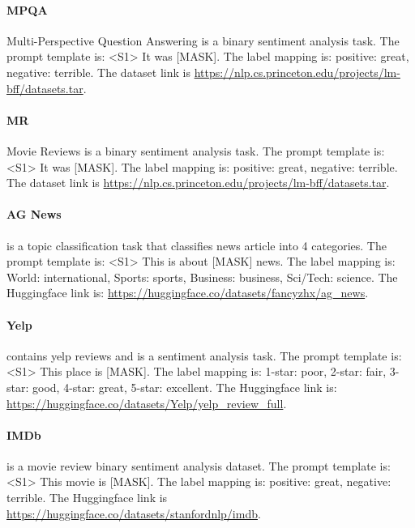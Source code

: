 \paragraph{MPQA} Multi-Perspective Question Answering \citep{wiebe2005annotating} is a binary sentiment analysis task. The prompt template is: \textless{}S1\textgreater{} It was {[}MASK{]}. The label mapping is: positive: great, negative: terrible. The dataset link is \url{https://nlp.cs.princeton.edu/projects/lm-bff/datasets.tar}.

\paragraph{MR} Movie Reviews \citep{pang2004sentimental} is a binary sentiment analysis task. The prompt template is: \textless{}S1\textgreater{} It was {[}MASK{]}. The label mapping is: positive: great, negative: terrible. The dataset link is \url{https://nlp.cs.princeton.edu/projects/lm-bff/datasets.tar}.

\paragraph{AG News} \citep{zhang2015character} is a topic classification task that classifies news article into 4 categories. The prompt template is: \textless{}S1\textgreater{} This is about {[}MASK{]} news. The label mapping is: World: international, Sports: sports, Business: business, Sci/Tech: science. The Huggingface link is: \url{https://huggingface.co/datasets/fancyzhx/ag_news}.

\paragraph{Yelp} \citep{zhang2015character} contains yelp reviews and is a sentiment analysis task. The prompt template is: \textless{}S1\textgreater{} This place is {[}MASK{]}. The label mapping is: 1-star: poor, 2-star: fair, 3-star: good, 4-star: great, 5-star: excellent. The Huggingface link is: \url{https://huggingface.co/datasets/Yelp/yelp_review_full}.


\paragraph{IMDb} \citep{maas2011learning} is a movie review binary sentiment analysis dataset. The prompt template is: \textless{}S1\textgreater{} This movie is {[}MASK{]}. The label mapping is: positive: great, negative: terrible. The Huggingface link is \url{https://huggingface.co/datasets/stanfordnlp/imdb}.

